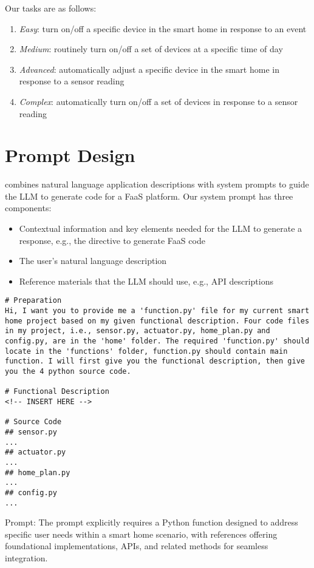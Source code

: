 Our tasks are as follows:

\begin{enumerate}
    \item \emph{Easy}: turn on/off a specific device in the smart home in response to an event
    \item \emph{Medium}: routinely turn on/off a set of devices at a specific time of day
    \item \emph{Advanced}: automatically adjust a specific device in the smart home in response to a sensor reading
    \item \emph{Complex}: automatically turn on/off a set of devices in response to a sensor reading
\end{enumerate}



\section{Prompt Design}
\label{sec:appendix:prompt}

\sysname{} combines natural language application descriptions with system prompts to guide the LLM to generate code for a FaaS platform.
Our system prompt has three components:

\begin{itemize}
    \item Contextual information and key elements needed for the LLM to generate a response, e.g., the directive to generate FaaS code
    \item The user's natural language description
    \item Reference materials that the LLM should use, e.g., API descriptions
\end{itemize}

\begin{listing}
    \begin{verbatim}
# Preparation
Hi, I want you to provide me a 'function.py' file for my current smart home project based on my given functional description. Four code files in my project, i.e., sensor.py, actuator.py, home_plan.py and config.py, are in the 'home' folder. The required 'function.py' should locate in the 'functions' folder, function.py should contain main function. I will first give you the functional description, then give you the 4 python source code.

# Functional Description
<!-- INSERT HERE -->

# Source Code
## sensor.py
...
## actuator.py
...
## home_plan.py
...
## config.py
...
\end{verbatim}
    \caption{
        \sysname{} Prompt: The prompt explicitly requires a Python function designed to address specific user needs within a smart home scenario, with references offering foundational implementations, APIs, and related methods for seamless integration.
    }
    \label{fig:appendix:llm4faas-prompt}
\end{listing}

